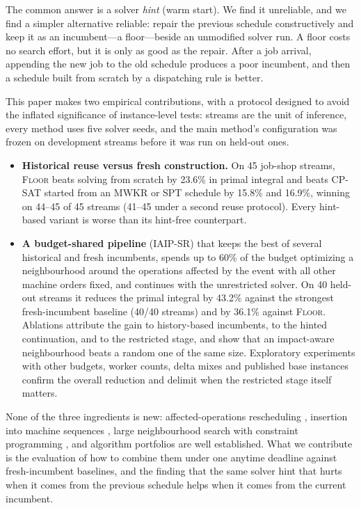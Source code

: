 \documentclass[letterpaper]{article} %
\newcommand{\mfloor}{\textsc{Floor}}
\newcommand{\miaip}{\textsc{IAIP-SR}}
\begin{document}
The common answer is a solver \emph{hint} (warm start). We find it unreliable, and we find a simpler alternative reliable: repair the previous schedule constructively and keep it as an incumbent---a floor---beside an unmodified solver run. A floor costs no search effort, but it is only as good as the repair. After a job arrival, appending the new job to the old schedule produces a poor incumbent, and then a schedule built from scratch by a dispatching rule is better.

This paper makes two empirical contributions, with a protocol designed to avoid the inflated significance of instance-level tests: streams are the unit of inference, every method uses five solver seeds, and the main method's configuration was frozen on development streams before it was run on held-out ones.
\begin{itemize}
\item \textbf{Historical reuse versus fresh construction.} On 45 job-shop streams, \mfloor{} beats solving from scratch by 23.6\% in primal integral and beats CP-SAT started from an MWKR or SPT schedule by 15.8\% and 16.9\%, winning on 44--45 of 45 streams (41--45 under a second reuse protocol). Every hint-based variant is worse than its hint-free counterpart.
\item \textbf{A budget-shared pipeline} (\miaip) that keeps the best of several historical and fresh incumbents, spends up to 60\% of the budget optimizing a neighbourhood around the operations affected by the event with all other machine orders fixed, and continues with the unrestricted solver. On 40 held-out streams it reduces the primal integral by 43.2\% against the strongest fresh-incumbent baseline (40/40 streams) and by 36.1\% against \mfloor{}. Ablations attribute the gain to history-based incumbents, to the hinted continuation, and to the restricted stage, and show that an impact-aware neighbourhood beats a random one of the same size. Exploratory experiments with other budgets, worker counts, delta mixes and published base instances confirm the overall reduction and delimit when the restricted stage itself matters.
\end{itemize}
None of the three ingredients is new: affected-operations rescheduling \citep{abumaizar1997}, insertion into machine sequences \citep{werner1995}, large neighbourhood search with constraint programming \citep{shaw1998,godard2005}, and algorithm portfolios \citep{gomes2001} are well established. What we contribute is the evaluation of how to combine them under one anytime deadline against fresh-incumbent baselines, and the finding that the same solver hint that hurts when it comes from the previous schedule helps when it comes from the current incumbent.
\end{document}
